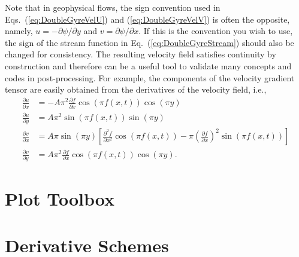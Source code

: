 \documentclass[10pt, twoside]{book}
\begin{document}
			Note that in geophysical flows, the sign convention used in Eqs.~(\ref{eq:DoubleGyreVelU}) and (\ref{eq:DoubleGyreVelV}) is often the opposite, namely, $u = -\partial\psi/{\partial}y$ and $v = \partial\psi/{\partial}x$. If this is the convention you wish to use, the sign of the stream function in Eq.~(\ref{eq:DoubleGyreStream}) should also be changed for consistency. The resulting velocity field satisfies continuity by construction and therefore can be a useful tool to validate many concepts and codes in post-processing. For example, the components of the velocity gradient tensor are easily obtained from the derivatives of the velocity field, i.e.,
			\begin{subequations}
			\label{eq:DoubleGyreVgt}
				\begin{align}
					\frac{\partial u}{\partial x} &= -A\pi^2\frac{\partial f}{\partial x}\cos\left({\pi}f\left(x,t\right)\right)\cos\left({\pi}y\right)\label{eq:DoubleGyreVgtUx}\\
					\frac{\partial u}{\partial y} &= A\pi^2\sin\left({\pi}f\left(x,t\right)\right)\sin\left({\pi}y\right)\label{eq:DoubleGyreVgtUy}\\
					\frac{\partial v}{\partial x} &= A\pi\sin\left({\pi}y\right)\left[\frac{\partial^2 f}{\partial x^2}\cos\left({\pi}f\left(x,t\right)\right) - \pi\left(\frac{\partial f}{\partial x}\right)^2\sin\left({\pi}f\left(x,t\right)\right)\right]\label{eq:DoubleGyreVgtVx}\\
					\frac{\partial v}{\partial y} &= A\pi^2\frac{\partial f}{\partial x}\cos\left({\pi}f\left(x,t\right)\right)\cos\left({\pi}y\right).\label{eq:DoubleGyreVgtVy}
				\end{align}
			\end{subequations}
			
	\chapter{\label{chp:Plots}Plot Toolbox}
		
	\chapter{\label{chp:DerivSchemes}Derivative Schemes}
		
\end{document}
